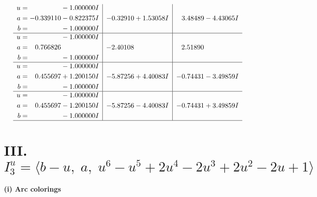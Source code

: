 \documentclass[1p]{elsarticle_modified}
\theoremstyle{definition}
\begin{document}
$$\begin{array}{c|c|c}
\begin{aligned}
u &= \phantom{-0.000000 } -1.000000 I \\
a &= -0.339110 - 0.822375 I \\
b &= \phantom{-0.000000 } -1.000000 I\end{aligned}
 & -0.32910 + 1.53058 I & \phantom{-}3.48489 - 4.43065 I \\ \hline\begin{aligned}
u &= \phantom{-0.000000 } -1.000000 I \\
a &= \phantom{-}0.766826\phantom{ +0.000000I} \\
b &= \phantom{-0.000000 } -1.000000 I\end{aligned}
 & -2.40108\phantom{ +0.000000I} & \phantom{-}2.51890\phantom{ +0.000000I} \\ \hline\begin{aligned}
u &= \phantom{-0.000000 } -1.000000 I \\
a &= \phantom{-}0.455697 + 1.200150 I \\
b &= \phantom{-0.000000 } -1.000000 I\end{aligned}
 & -5.87256 + 4.40083 I & -0.74431 - 3.49859 I \\ \hline\begin{aligned}
u &= \phantom{-0.000000 } -1.000000 I \\
a &= \phantom{-}0.455697 - 1.200150 I \\
b &= \phantom{-0.000000 } -1.000000 I\end{aligned}
 & -5.87256 - 4.40083 I & -0.74431 + 3.49859 I\\
 \hline 
 \end{array}$$\newpage\newpage\renewcommand{\arraystretch}{1}
\centering \section*{III. $I^u_{3}= \langle b- u,\;a,\;u^6- u^5+2 u^4-2 u^3+2 u^2-2 u+1 \rangle$}
\flushleft \textbf{(i) Arc colorings}\\
\end{document}
